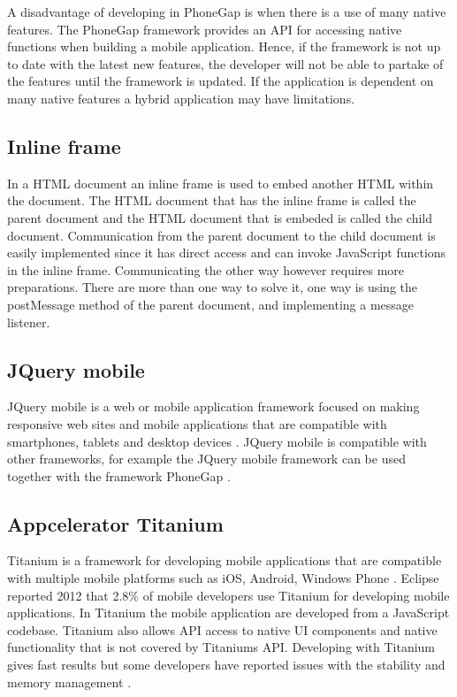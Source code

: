 A disadvantage of developing in PhoneGap is when there is a use of many native features. The PhoneGap framework provides an API for accessing native functions when building a mobile application. Hence, if the framework is not up to date with the latest new features, the developer will not be able to partake of the features until the framework is updated. If the application is dependent on many native features a hybrid application may have limitations\cite{kohan2015}.

\subsection{Inline frame}\label{subsec:inline-frame}
In a HTML document an inline frame is used to embed another HTML within the document. The HTML document that has the inline frame is called the parent document and the HTML document that is embeded is called the child document. Communication from the parent document to the child document is easily implemented since it has direct access and can invoke JavaScript functions in the inline frame. Communicating the other way however requires more preparations. There are more than one way to solve it, one way is using the postMessage method of the parent document, and implementing a message listener.

\subsection{JQuery mobile}\label{subsec:jquery-mobile}
JQuery mobile is a web or mobile application framework focused on making responsive web sites and mobile applications that are compatible with smartphones, tablets and desktop devices \cite{jquery-mobile15}. JQuery mobile is compatible with other frameworks, for example the JQuery mobile framework can be used together with the framework PhoneGap \cite{tech-republic-jquery-mobile-compatible14}. 

\subsection{Appcelerator Titanium}\label{subsec:appcelerator-titanium}
Titanium is a framework for developing mobile applications that are compatible with multiple mobile platforms such as iOS, Android, Windows Phone \cite{titanium15}. Eclipse reported 2012 that 2.8\% of mobile developers use Titanium for developing mobile applications. In Titanium the mobile application are developed from a JavaScript codebase. Titanium also allows API access to native UI components and native functionality that is not covered by Titaniums API. Developing with Titanium gives fast results but some developers have reported issues with the stability and memory management \cite{stay-away1-titanium15} \cite{stay-away2-titanium15}. 

